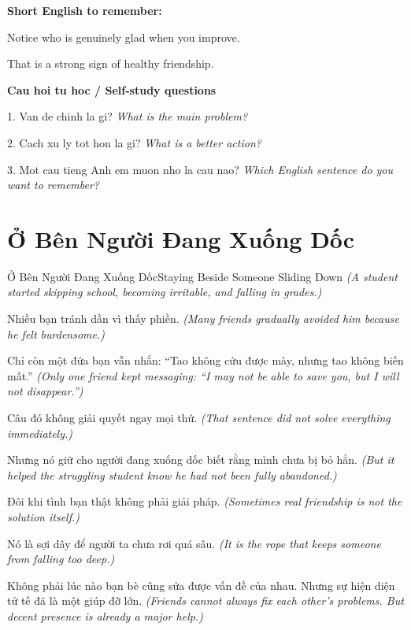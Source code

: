 \begin{ghinhoanh}
\textbf{Short English to remember:}

Notice who is genuinely glad when you improve.

That is a strong sign of healthy friendship.

\end{ghinhoanh}

\begin{tuhocnhanh}
\textbf{Cau hoi tu hoc / Self-study questions}

1. Van de chinh la gi? \textit{What is the main problem?}

2. Cach xu ly tot hon la gi? \textit{What is a better action?}

3. Mot cau tieng Anh em muon nho la cau nao? \textit{Which English sentence do you want to remember?}
\end{tuhocnhanh}
\ngancach

\section{Ở Bên Người Đang Xuống Dốc}
\begin{truyen}{Ở Bên Người Đang Xuống Dốc}{Staying Beside Someone Sliding Down}
\textit{(A student started skipping school, becoming irritable, and falling in grades.)}

Nhiều bạn tránh dần vì thấy phiền.
\textit{(Many friends gradually avoided him because he felt burdensome.)}

Chỉ còn một đứa bạn vẫn nhắn: ``Tao không cứu được mày, nhưng tao không biến mất.''
\textit{(Only one friend kept messaging: ``I may not be able to save you, but I will not disappear.'')}

Câu đó không giải quyết ngay mọi thứ.
\textit{(That sentence did not solve everything immediately.)}

Nhưng nó giữ cho người đang xuống dốc biết rằng mình chưa bị bỏ hẳn.
\textit{(But it helped the struggling student know he had not been fully abandoned.)}

Đôi khi tình bạn thật không phải giải pháp.
\textit{(Sometimes real friendship is not the solution itself.)}

Nó là sợi dây để người ta chưa rơi quá sâu.
\textit{(It is the rope that keeps someone from falling too deep.)}

\end{truyen}

\begin{baihoc}
Không phải lúc nào bạn bè cũng sửa được vấn đề của nhau. Nhưng sự hiện diện tử tế đã là một giúp đỡ lớn.
\textit{(Friends cannot always fix each other’s problems. But decent presence is already a major help.)}
\end{baihoc}

